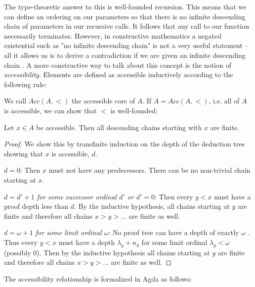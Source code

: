 The type-theoretic answer to this is well-founded recursion. This means that we can define an ordering on our parameters so that there is no infinite descending chain of parameters in our recursive calls. It follows that any call to our function necessarily terminates. However, in constructive mathematics a negated existential such as "no infinite descending chain" is not a very useful statement -- all it allows us is to derive a contradiction if we are given an infinite descending chain \cite{mietek:2020:minimal}. A more constructive way to talk about this concept is the notion of \emph{accessibility}. Elements are defined as accessible inductively according to the following rule:

\begin{prooftree}
\end{prooftree}

We call $Acc(A, <)$ the accessible core of $A$. If $A = Acc(A, <)$, i.e. all of $A$ is accessible, we can show that $<$ is well-founded:

\begin{lemma}
    Let $x \in A$ be accessible. Then all descending chains starting with $x$ are finite.
\end{lemma}

\begin{proof}
    We show this by transfinite induction on the depth of the deduction tree showing that $x$ is accessible, $d$.

    \emph{$d = 0$}: Then $x$ must not have any predecessors. There can be no non-trivial chain starting at $x$.

    \emph{$d = d' + 1$ for some successor ordinal $d'$ or $d' = 0$}: Then every $y < x$ must have a proof depth less than $d$. By the inductive hypothesis, all chains starting at $y$ are finite and therefore all chains $x > y > \ldots$ are finite as well.

    \emph{$d = \omega + 1$ for some limit ordinal $\omega$}: No proof tree can have a depth of exactly $\omega$ . Thus every $y < x$ must have a depth $\lambda_y + n_y$ for some limit ordinal $\lambda_y < \omega$ (possibly 0). Then by the inductive hypothesis all chains starting at $y$ are finite and therefore all chains $x > y > \ldots$ are finite as well.
\end{proof}

The accessibility relationship is formalized in Agda as follows:

